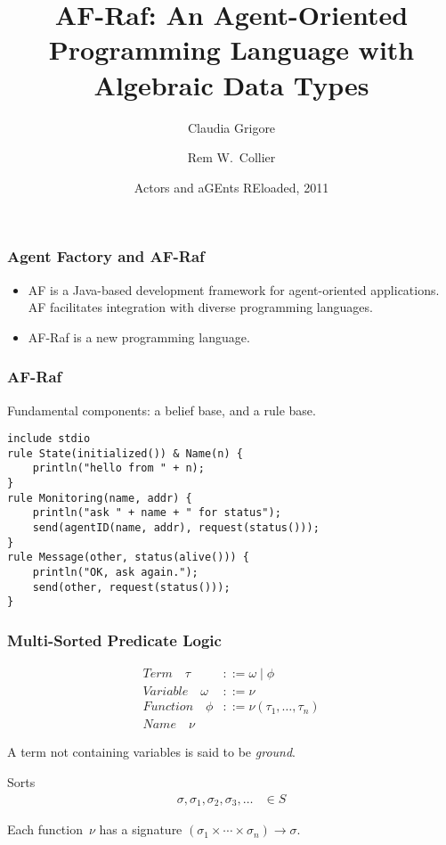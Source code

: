 \documentclass{beamer}
\title{AF-Raf: An Agent-Oriented Programming Language with Algebraic Data Types}
\author{Claudia Grigore \and Rem W.~Collier}
\institute{
  School of Computer Science\\
  University College Dublin\\
  IRCSET}
\date[AGERE~2011]{Actors and aGEnts REloaded, 2011}
\begin{document}
\begin{frame}
  \titlepage
\note[item]{}
\end{frame}

\begin{frame}
\frametitle{Agent Factory and AF-Raf}
\begin{itemize}
\item
  AF is a Java-based development framework for agent-oriented applications.
  AF facilitates integration with diverse programming languages.
\item
  AF-Raf is a new programming language.
\end{itemize}
\note[item]{}
\end{frame}

\begin{frame}[fragile]
\frametitle{AF-Raf}
Fundamental components: a belief base, and a rule base.
\medskip
\begin{Verbatim}
include stdio
rule State(initialized()) & Name(n) {
    println("hello from " + n);
}
rule Monitoring(name, addr) {
    println("ask " + name + " for status");
    send(agentID(name, addr), request(status()));
}
rule Message(other, status(alive())) {
    println("OK, ask again.");
    send(other, request(status()));
}
\end{Verbatim}

\end{frame}

\begin{frame}[fragile]
\frametitle{Multi-Sorted Predicate Logic}
\begin{align*}
\mathit{Term}\quad\tau &::= \omega \mid \phi \\
\mathit{Variable}\quad\omega &::= \nu \\
\mathit{Function}\quad\phi &::= \nu(\tau_1,\ldots,\tau_n) \\
\mathit{Name}\quad\nu
\end{align*}

A term not containing variables is said to be
\emph{ground}.

\begin{block}{Sorts}
\begin{align*}
\sigma, \sigma_1, \sigma_2, \sigma_3, \ldots &\in S
\end{align*}

Each function~$\nu$ has a signature
$(\sigma_1\times\cdots\times\sigma_n)\to\sigma$.  
\end{block}

\end{frame}
\end{document}
